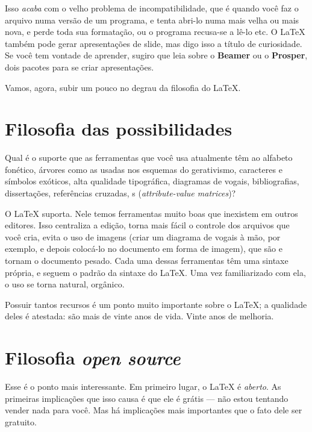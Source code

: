 Isso \emph{acaba} com o velho problema de incompatibilidade, que é quando você faz o arquivo numa versão de um programa, e tenta abri-lo numa mais velha ou mais nova, e perde toda sua formatação, ou o programa recusa-se a lê-lo etc. O \LaTeX{} também pode gerar apresentações de slide, mas digo isso a título de curiosidade. Se você tem vontade de aprender, sugiro que leia sobre o \textbf{Beamer} ou o \textbf{Prosper}, dois pacotes para se criar apresentações.

Vamos, agora, subir um pouco no degrau da filosofia do \LaTeX{}.

\section{Filosofia das possibilidades}

Qual é o suporte que as ferramentas que você usa atualmente têm ao alfabeto fonético, árvores como as usadas nos esquemas do gerativismo, caracteres e símbolos exóticos, alta qualidade tipográfica, diagramas de vogais, bibliografias, dissertações, referências cruzadas, s (\emph{attribute-value matrices})?

O \LaTeX{} suporta. Nele temos ferramentas muito boas que inexistem em outros editores. Isso centraliza a edição, torna mais fácil o controle dos arquivos que você cria, evita o uso de imagens (criar um diagrama de vogais à mão, por exemplo, e depois colocá-lo no documento em forma de imagem), que são e tornam o documento pesado. Cada uma dessas ferramentas têm uma sintaxe própria, e seguem o padrão da sintaxe do \LaTeX. Uma vez familiarizado com ela, o uso se torna natural, orgânico.

Possuir tantos recursos é um ponto muito importante sobre o \LaTeX; a qualidade deles é atestada: são mais de vinte anos de vida. Vinte anos de melhoria.

\section{Filosofia \emph{open source}}

Esse é o ponto mais interessante. Em primeiro lugar, o \LaTeX{} é \emph{aberto}. As primeiras implicações que isso causa é que ele é grátis --- não estou tentando vender nada para você. Mas há implicações mais importantes que o fato dele ser gratuito.

